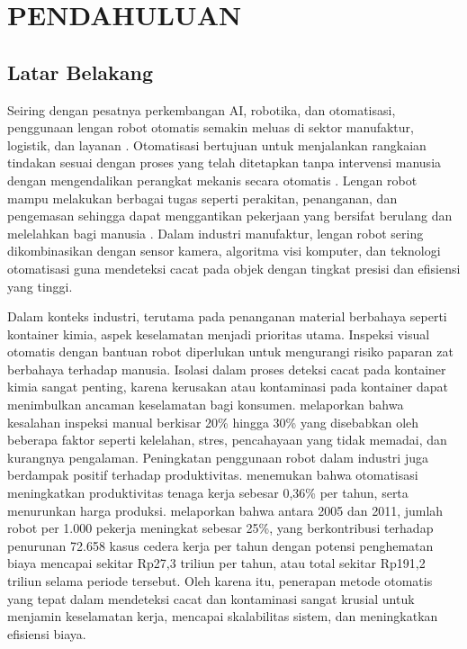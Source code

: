 \chapter{PENDAHULUAN}
\section{Latar Belakang}
Seiring dengan pesatnya perkembangan AI,
robotika, dan otomatisasi, penggunaan lengan robot otomatis semakin
meluas di sektor manufaktur, logistik, dan layanan \citep{1}. Otomatisasi
bertujuan untuk menjalankan rangkaian tindakan sesuai dengan proses
yang telah ditetapkan tanpa intervensi manusia dengan mengendalikan
perangkat mekanis secara otomatis \citep{2}. Lengan robot mampu
melakukan berbagai tugas seperti perakitan, penanganan, dan
pengemasan sehingga dapat menggantikan pekerjaan yang bersifat
berulang dan melelahkan bagi manusia \citep{3}. Dalam industri
manufaktur, lengan robot sering
dikombinasikan dengan sensor kamera, algoritma visi komputer, dan
teknologi otomatisasi guna mendeteksi cacat pada objek dengan tingkat
presisi dan efisiensi yang tinggi.

Dalam konteks industri, terutama pada penanganan material berbahaya
seperti kontainer kimia, aspek keselamatan menjadi prioritas utama.
Inspeksi visual otomatis dengan bantuan robot diperlukan untuk
mengurangi risiko paparan zat berbahaya terhadap manusia. Isolasi
dalam proses deteksi cacat pada kontainer kimia sangat
penting, karena kerusakan atau kontaminasi pada kontainer dapat
menimbulkan ancaman keselamatan bagi konsumen. \citet{4} melaporkan
bahwa kesalahan
inspeksi manual berkisar 20\% hingga 30\% yang disebabkan oleh
beberapa faktor seperti kelelahan,
stres, pencahayaan yang tidak memadai, dan kurangnya
pengalaman. Peningkatan penggunaan robot dalam industri juga
berdampak positif terhadap produktivitas. \citet{5} menemukan bahwa
otomatisasi meningkatkan produktivitas tenaga kerja sebesar 0,36\%
per tahun, serta menurunkan harga produksi. \citet{6}
melaporkan bahwa antara 2005 dan 2011, jumlah robot per 1.000
pekerja meningkat sebesar 25\%, yang berkontribusi terhadap penurunan
72.658 kasus cedera kerja per tahun dengan potensi penghematan biaya
mencapai sekitar Rp27,3 triliun per tahun, atau total sekitar Rp191,2
triliun selama periode tersebut. Oleh
karena itu, penerapan metode otomatis yang tepat dalam mendeteksi
cacat dan kontaminasi sangat krusial untuk menjamin keselamatan
kerja, mencapai skalabilitas sistem, dan meningkatkan efisiensi biaya.

